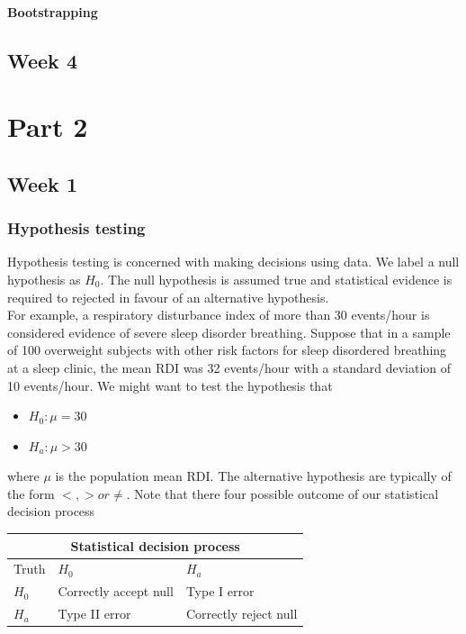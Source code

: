 \documentclass{homework}
\begin{document}
\paragraph{\textbf{Bootstrapping}}

\subsection{Week 4}

\clearpage

\section{Part 2}
\subsection{Week 1}

\subsubsection{Hypothesis testing}

Hypothesis testing is concerned with making decisions using data. We label a null hypothesis as $H_0$. The null hypothesis is assumed true and statistical evidence is required to rejected in favour of an alternative hypothesis. \\

For example, a respiratory disturbance index of more than 30 events/hour is considered evidence of severe sleep disorder breathing. Suppose that in a sample of 100 overweight subjects with other risk factors for sleep disordered breathing at a sleep clinic, the mean RDI was 32 events/hour with a standard deviation of 10 events/hour. We might want to test the hypothesis that 

\begin{itemize}
    \item $H_0 : \mu = 30$ 
    \item $H_a : \mu > 30$ 
\end{itemize}

where $\mu$ is the population mean RDI. The alternative hypothesis are typically of the form $<,> or \neq$. Note that there four possible outcome of our statistical decision process\\

\begin{center}
\begin{tabular}{ |p{1cm}||p{5cm}|p{5cm}|  }
 \hline
 \multicolumn{3}{|c|}{Statistical decision process} \\
 \hline
 Truth& $H_0$ & $H_a$\\
 \hline
 $H_0$  & Correctly accept null & Type I error\\
 $H_a$ &  Type II error & Correctly reject null\\
 \hline
\end{tabular}
\end{center}
\end{document}
